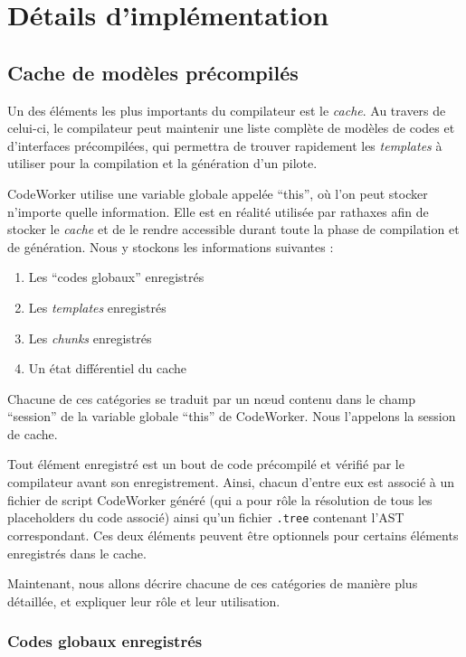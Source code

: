 \documentclass[french]{rtxreport}
\begin{document}
\chapter{Détails d'implémentation}



\section{Cache de modèles précompilés}

Un des éléments les plus importants du compilateur est le \emph{cache}. Au
travers de celui-ci, le compilateur peut maintenir une liste complète de
modèles de codes et d'interfaces précompilées, qui permettra de trouver
rapidement les \emph{templates} à utiliser pour la compilation et la génération
d'un pilote.

CodeWorker utilise une variable globale appelée ``this'', où l'on peut stocker
n'importe quelle information. Elle est en réalité utilisée par rathaxes afin de
stocker le \emph{cache} et de le rendre accessible durant toute la phase de
compilation et de génération. Nous y stockons les informations suivantes :
\begin{enumerate}
    \item Les ``codes globaux'' enregistrés
    \item Les \emph{templates} enregistrés
    \item Les \emph{chunks} enregistrés
    \item Un état différentiel du cache
\end{enumerate}

Chacune de ces catégories se traduit par un nœud contenu dans le champ
``session'' de la variable globale ``this'' de CodeWorker. Nous l'appelons la
session de cache.

Tout élément enregistré est un bout de code précompilé et vérifié par le
compilateur avant son enregistrement. Ainsi, chacun d'entre eux est associé à
un fichier de script CodeWorker généré (qui a pour rôle la résolution de tous
les placeholders du code associé) ainsi qu'un fichier \texttt{.tree} contenant
l'AST correspondant. Ces deux éléments peuvent être optionnels pour certains
éléments enregistrés dans le cache.

Maintenant, nous allons décrire chacune de ces catégories de manière plus
détaillée, et expliquer leur rôle et leur utilisation.


\subsection{Codes globaux enregistrés}
\end{document}
